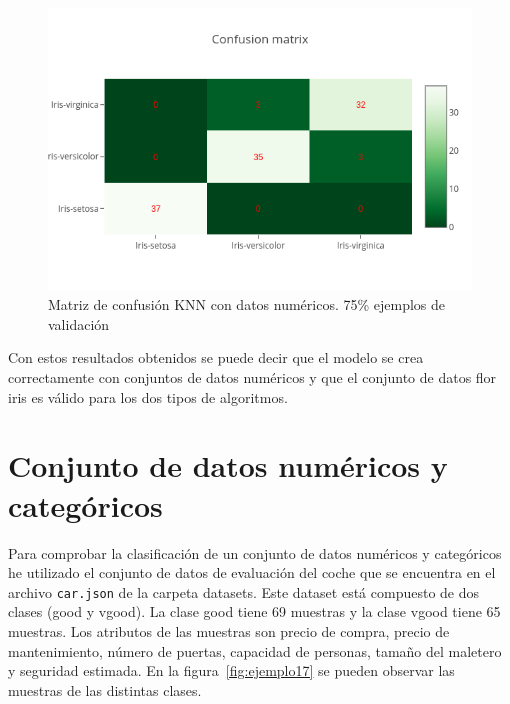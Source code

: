 \documentclass[a4paper, 12pt]{book}
\begin{document}
\begin{figure}
	\centering
	\includegraphics[width=12cm, keepaspectratio]{img/cm_num_knn2.png}
	\caption{Matriz de confusión KNN con datos numéricos. 75\% ejemplos de validación} 	
	\label{fig:ejemplo16}
\end{figure}

Con estos resultados obtenidos se puede decir que el modelo se crea correctamente con conjuntos de datos numéricos y que el conjunto de datos flor iris es válido para los dos tipos de algoritmos.

\section{Conjunto de datos numéricos y categóricos}
\label{subsec:numericosycategoricos}

Para comprobar la clasificación de un conjunto de datos numéricos y categóricos he utilizado el conjunto de datos de evaluación del coche que se encuentra en el archivo \texttt{car.json} de la carpeta datasets. Este dataset está compuesto de dos clases (good y vgood). La clase good tiene 69 muestras y la clase vgood tiene 65 muestras.
Los atributos de las muestras son precio de compra, precio de mantenimiento, número de puertas, capacidad de personas, tamaño del maletero y seguridad estimada. 
En la figura~\ref{fig:ejemplo17} se pueden observar las muestras de las distintas clases.
\end{document}
